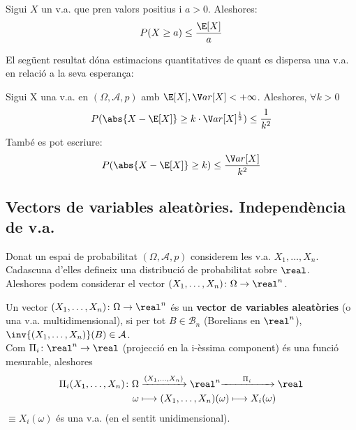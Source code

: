 \begin{thm}
  Sigui $X$ un v.a. que pren valors positius i $a > 0$. Aleshores: \\
  \[
    P(X \geq a) \leq \frac{\E[X]}{a}
  \]
\end{thm}

El següent resultat dóna estimacions quantitatives de quant es dispersa una v.a. en relació a la seva esperança:

\begin{thm}
  Sigui X una v.a. en $(\Omega, \mathcal{A}, p)$ amb $\E[X], \V ar[X] < +\infty$. Aleshores, $\forall k > 0$
  \[
    P(\abs{X-\E[X]}\geq k\cdot \V ar[X]^{\frac{1}{2}}) \leq \frac{1}{k^{2}}
  \]
  També es pot escriure:
  \[
    P(\abs{X-\E[X]}\geq k) \leq \frac{\V ar[X]}{k^{2}}
  \]
\end{thm}

\subsection{Vectors de variables aleatòries. Independència de v.a.}

Donat un espai de probabilitat $(\Omega, \mathcal{A}, p)$ considerem les v.a. $X_{1}, \ldots, X_{n}$.  Cadascuna d'elles defineix una distribució de probabilitat sobre $\real$. \\
Aleshores podem considerar el vector $(X_{1}, \ldots, X_{n})\colon \Omega \to \real^{n}$. 

\begin{defi}
  Un vector $(X_{1}, \ldots, X_{n})\colon \Omega \to \real^{n}$ és un \textbf{vector de variables aleatòries} (o una v.a. multidimensional), si per tot $B \in \mathcal{B}_{n}$ (Borelians en $\real^{n}$), $\inv{(X_{1}, \ldots, X_{n})}(B) \in \mathcal{A}$. \\
  
  Com $\Pi_{i}\colon \real^{n} \to \real$ (projecció en la i-èssima component) és una funció mesurable, aleshores 
  \[
  \begin{aligned}
      \Pi_{i}(X_{1}, \ldots, X_{n}) \colon \Omega &\xrightarrow{(X_{1}, \ldots, X_{n})} \real^{n} \hspace{-0.1cm} \xrightarrow{\qquad \Pi_{i} \qquad} \real \\
      \omega &\longmapsto (X_{1}, \ldots, X_{n})(\omega) \longmapsto X_{i}(\omega)
  \end{aligned}
  \]
  $\equiv X_{i}(\omega)$ és una v.a. (en el sentit unidimensional).
\end{defi}

